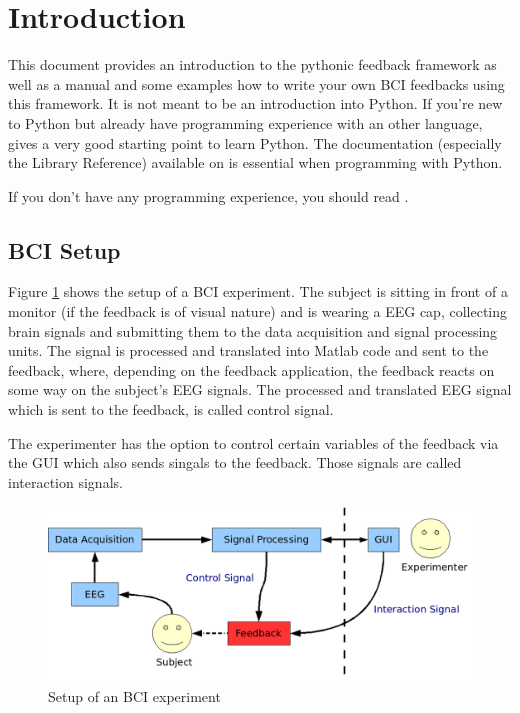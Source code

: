 \section{Introduction}
This document provides an introduction to the pythonic feedback framework as well as a manual and some examples how to write your own BCI feedbacks using this framework. It is not meant to be an introduction into Python. If you're new to Python but already have programming experience with an other language, \cite{ref:python-book} gives a very good starting point to learn Python. The documentation (especially the Library Reference) available on \cite{ref:python-onlinedoc} is essential when programming with Python.

If you don't have any programming experience, you should read \cite{ref:python-nonprogrammers-doc}.

\subsection{BCI Setup}
Figure \ref{fig:setup} shows the setup of a BCI experiment. The subject is sitting in front of a monitor (if the feedback is of visual nature) and is wearing a EEG cap, collecting brain signals and submitting them to the data acquisition and signal processing units. The signal is processed and translated into Matlab code and sent to the feedback, where, depending on the feedback application, the feedback reacts on some way on the subject's EEG signals. The processed and translated EEG signal which is sent to the feedback, is called control signal.

The experimenter has the option to control certain variables of the feedback via the GUI which also sends singals to the feedback. Those signals are called interaction signals.

\begin{figure}
 \centering
 \includegraphics[width=\figwidth]{aufbau-en.png}
 \caption{Setup of an BCI experiment}
 \label{fig:setup}
\end{figure}

